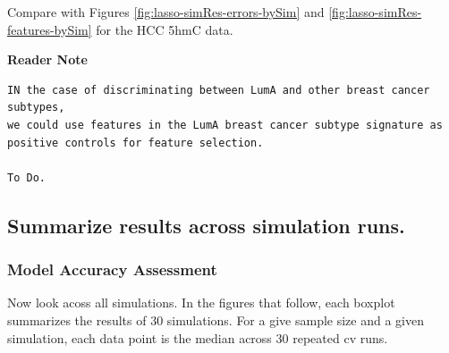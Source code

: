 \documentclass[
]{book}
\begin{document}
Compare with Figures
\ref{fig:lasso-simRes-errors-bySim}
and
\ref{fig:lasso-simRes-features-bySim}
for the HCC 5hmC data.

\textbf{Reader Note}

\begin{verbatim}
IN the case of discriminating between LumA and other breast cancer subtypes,
we could use features in the LumA breast cancer subtype signature as
positive controls for feature selection.

To Do.
\end{verbatim}

\hypertarget{summarize-results-across-simulation-runs.-1}{%
\subsection{Summarize results across simulation runs.}\label{summarize-results-across-simulation-runs.-1}}

\hypertarget{model-accuracy-assessment-3}{%
\subsubsection{Model Accuracy Assessment}\label{model-accuracy-assessment-3}}

Now look acoss all simulations. In the figures that follow, each boxplot
summarizes the results of 30 simulations. For a give sample size and a
given simulation, each data point is the median across 30 repeated cv runs.
\end{document}
